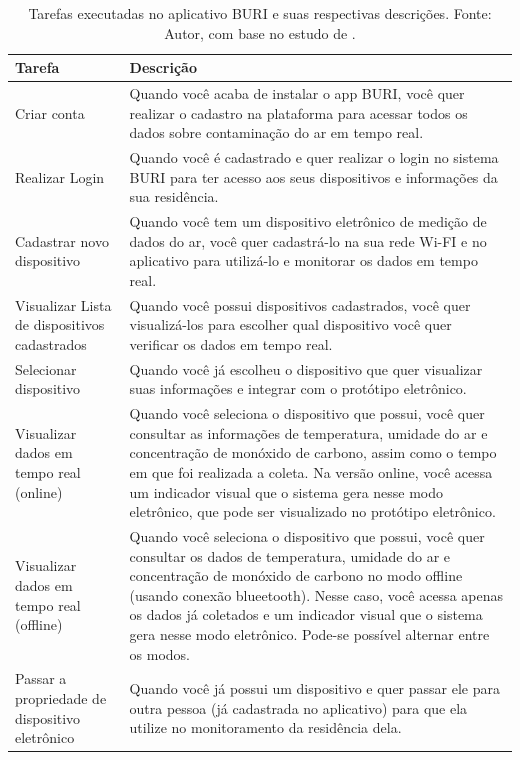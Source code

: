 \begin{table}[htbp]
    \centering
    \caption{Tarefas executadas no aplicativo BURI e suas respectivas descrições. Fonte: Autor, com base no estudo de \cite{ufam-design}.}\label{tab:cenarios-de-uso}
    \begin{tabular}{p{4cm}|p{10cm}}
    \toprule
    \textbf{Tarefa} & \textbf{Descrição} \\ \midrule
    Criar conta & Quando você acaba de instalar o app BURI, você quer realizar o cadastro na plataforma para acessar todos os dados sobre contaminação do ar em tempo real. \\ \midrule
    Realizar Login & Quando você é cadastrado e quer realizar o login no sistema BURI para ter acesso aos seus dispositivos e informações da sua residência. \\ \midrule
    Cadastrar novo dispositivo & Quando você tem um dispositivo eletrônico de medição de dados do ar, você quer cadastrá-lo na sua rede Wi-FI e no aplicativo para utilizá-lo e monitorar os dados em tempo real. \\ \midrule
    Visualizar Lista de dispositivos cadastrados & Quando você possui dispositivos cadastrados, você quer visualizá-los para escolher qual dispositivo você quer verificar os dados em tempo real. \\ \midrule
    Selecionar dispositivo & Quando você já escolheu o dispositivo que quer visualizar suas informações e integrar com o protótipo eletrônico. \\ \midrule
    Visualizar dados em tempo real (online) & Quando você seleciona o dispositivo que possui, você quer consultar as informações de temperatura, umidade do ar e concentração de monóxido de carbono, assim como o tempo em que foi realizada a coleta. Na versão online, você acessa um indicador visual que o sistema gera nesse modo eletrônico, que pode ser visualizado no protótipo eletrônico. \\ \midrule
    Visualizar dados em tempo real (offline) & Quando você seleciona o dispositivo que possui, você quer consultar os dados de temperatura, umidade do ar e concentração de monóxido de carbono no modo offline (usando conexão blueetooth). Nesse caso, você acessa apenas os dados já coletados e um indicador visual que o sistema gera nesse modo eletrônico. Pode-se possível alternar entre os modos. \\ \midrule
    Passar a propriedade de dispositivo eletrônico & Quando você já possui um dispositivo e quer passar ele para outra pessoa (já cadastrada no aplicativo) para que ela utilize no monitoramento da residência dela. \\ \bottomrule
    \end{tabular}
\end{table}

